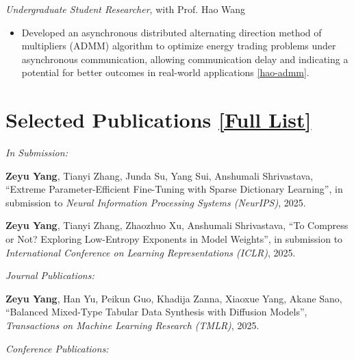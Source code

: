 \documentclass[11pt]{article}
\begin{document}
\textit{Undergraduate Student Researcher}, with Prof. Hao Wang

\begin{itemize}
    \item Developed an asynchronous distributed alternating direction method of multipliers (ADMM) algorithm to optimize energy trading problems under asynchronous communication, allowing communication delay and indicating a potential for better outcomes in real-world applications \ref{hao-admm}.
\end{itemize}

\section*{Selected Publications \hfill \href{https://scholar.google.com/citations?user=CaKsmnUAAAAJ&hl=en}{[Full List]}}

\textit{In Submission:}

\begin{enumerate}[label={[\arabic*]}]
    \item \label{anshu-lluf} \textbf{Zeyu Yang}, Tianyi Zhang, Junda Su, Yang Sui, Anshumali Shrivastava, ``Extreme Parameter-Efficient Fine-Tuning with Sparse Dictionary Learning'', in submission to \textit{Neural Information Processing Systems (NeurIPS)}, 2025.
    \item \label{anshu-fp8-compression} \textbf{Zeyu Yang}, Tianyi Zhang, Zhaozhuo Xu, Anshumali Shrivastava, ``To Compress or Not? Exploring Low-Entropy Exponents in Model Weights'', in submission to \textit{International Conference on Learning Representations (ICLR)}, 2025.
\end{enumerate}

\vspace{\lineskip}

\textit{Journal Publications:}

\begin{enumerate}[resume, label={[\arabic*]}]
    \item \label{akane-ddpm} \textbf{Zeyu Yang}, Han Yu, Peikun Guo, Khadija Zanna, Xiaoxue Yang, Akane Sano,
    ``Balanced Mixed-Type Tabular Data Synthesis with Diffusion Models'', \textit{Transactions on Machine Learning Research (TMLR)}, 2025.
\end{enumerate}

\vspace{\lineskip}
    
\textit{Conference Publications:}
\end{document}
